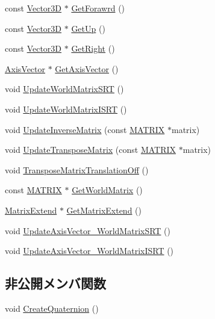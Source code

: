 \begin{DoxyCompactItemize}
\item 
const \mbox{\hyperlink{class_vector3_d}{Vector3D}} $\ast$ \mbox{\hyperlink{class_transform_a25e4832e15334d74ff847f0ff0b3564f}{Get\+Forawrd}} ()
\item 
const \mbox{\hyperlink{class_vector3_d}{Vector3D}} $\ast$ \mbox{\hyperlink{class_transform_a9f5700481ae42556f763726947feaf36}{Get\+Up}} ()
\item 
const \mbox{\hyperlink{class_vector3_d}{Vector3D}} $\ast$ \mbox{\hyperlink{class_transform_a57d1da919d8df7d2452149c4bbade4d2}{Get\+Right}} ()
\item 
\mbox{\hyperlink{class_axis_vector}{Axis\+Vector}} $\ast$ \mbox{\hyperlink{class_transform_ad300be34dddc6109ca142452e65aa77d}{Get\+Axis\+Vector}} ()
\item 
void \mbox{\hyperlink{class_transform_af1a2dcb4a9d37dd71c203ec248535887}{Update\+World\+Matrix\+S\+RT}} ()
\item 
void \mbox{\hyperlink{class_transform_a3d56e19fba7f44d5f938d62481846fbc}{Update\+World\+Matrix\+I\+S\+RT}} ()
\item 
void \mbox{\hyperlink{class_transform_a3d2e5da24fb1c8015f5bb9a6c0a7a7de}{Update\+Inverse\+Matrix}} (const \mbox{\hyperlink{_vector3_d_8h_a032295cd9fb1b711757c90667278e744}{M\+A\+T\+R\+IX}} $\ast$matrix)
\item 
void \mbox{\hyperlink{class_transform_a486ae5501b5081b22ee053f787e0e4a2}{Update\+Transpose\+Matrix}} (const \mbox{\hyperlink{_vector3_d_8h_a032295cd9fb1b711757c90667278e744}{M\+A\+T\+R\+IX}} $\ast$matrix)
\item 
void \mbox{\hyperlink{class_transform_a053037b225e6fb11e680cc60df15dd45}{Transpose\+Matrix\+Translation\+Off}} ()
\item 
const \mbox{\hyperlink{_vector3_d_8h_a032295cd9fb1b711757c90667278e744}{M\+A\+T\+R\+IX}} $\ast$ \mbox{\hyperlink{class_transform_a060f9487a18ad34549eab53a7ca5100d}{Get\+World\+Matrix}} ()
\item 
\mbox{\hyperlink{class_matrix_extend}{Matrix\+Extend}} $\ast$ \mbox{\hyperlink{class_transform_ab1101d4467d772f3ddc0558586e39c79}{Get\+Matrix\+Extend}} ()
\item 
void \mbox{\hyperlink{class_transform_af02515be1947506212ca1c23223ce0b3}{Update\+Axis\+Vector\+\_\+\+World\+Matrix\+S\+RT}} ()
\item 
void \mbox{\hyperlink{class_transform_a73a20f2b8baad21ba74a2b1c6d8a1ab2}{Update\+Axis\+Vector\+\_\+\+World\+Matrix\+I\+S\+RT}} ()
\end{DoxyCompactItemize}
\subsection*{非公開メンバ関数}
\begin{DoxyCompactItemize}
\item 
void \mbox{\hyperlink{class_transform_a7884cb828ace5c921e7138d83c43d689}{Create\+Quaternion}} ()
\end{DoxyCompactItemize}
